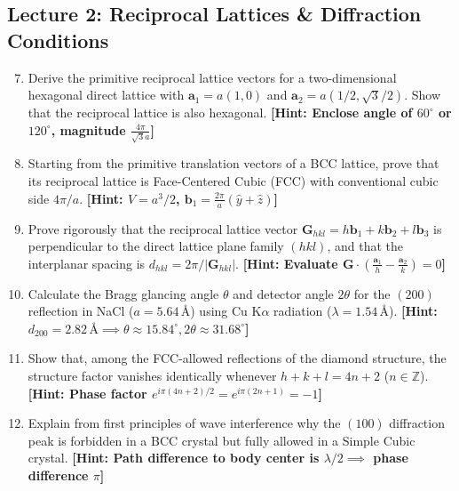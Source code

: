 \documentclass[11pt,a4paper]{article}
\begin{document}
\subsection*{Lecture 2: Reciprocal Lattices \& Diffraction Conditions}
\begin{enumerate}[leftmargin=1.8em, label=\textbf{2.\arabic*}]
    \setcounter{enumi}{6}
    \item Derive the primitive reciprocal lattice vectors for a two-dimensional hexagonal direct lattice with $\mathbf{a}_1 = a(1,0)$ and $\mathbf{a}_2 = a(1/2, \sqrt{3}/2)$. Show that the reciprocal lattice is also hexagonal. \hfill \textbf{[Hint: Enclose angle of $60^\circ$ or $120^\circ$, magnitude $\frac{4\pi}{\sqrt{3}a}$]}
    \item Starting from the primitive translation vectors of a BCC lattice, prove that its reciprocal lattice is Face-Centered Cubic (FCC) with conventional cubic side $4\pi/a$. \hfill \textbf{[Hint: $V = a^3/2$, $\mathbf{b}_1 = \frac{2\pi}{a}(\hat{y}+\hat{z})$]}
    \item Prove rigorously that the reciprocal lattice vector $\mathbf{G}_{hkl} = h\mathbf{b}_1 + k\mathbf{b}_2 + l\mathbf{b}_3$ is perpendicular to the direct lattice plane family $(hkl)$, and that the interplanar spacing is $d_{hkl} = 2\pi/|\mathbf{G}_{hkl}|$. \hfill \textbf{[Hint: Evaluate $\mathbf{G}\cdot(\frac{\mathbf{a}_1}{h}-\frac{\mathbf{a}_2}{k}) = 0$]}
    \item Calculate the Bragg glancing angle $\theta$ and detector angle $2\theta$ for the $(200)$ reflection in NaCl ($a = 5.64\,\text{\AA}$) using Cu K$\alpha$ radiation ($\lambda = 1.54\,\text{\AA}$). \hfill \textbf{[Hint: $d_{200} = 2.82\,\text{\AA} \implies \theta \approx 15.84^\circ, 2\theta \approx 31.68^\circ$]}
    \item Show that, among the FCC-allowed reflections of the diamond structure, the structure factor vanishes identically whenever $h+k+l = 4n+2$ ($n \in \mathbb{Z}$). \hfill \textbf{[Hint: Phase factor $e^{i\pi(4n+2)/2} = e^{i\pi(2n+1)} = -1$]}
    \item Explain from first principles of wave interference why the $(100)$ diffraction peak is forbidden in a BCC crystal but fully allowed in a Simple Cubic crystal. \hfill \textbf{[Hint: Path difference to body center is $\lambda/2 \implies$ phase difference $\pi$]}
\end{enumerate}
\end{document}
